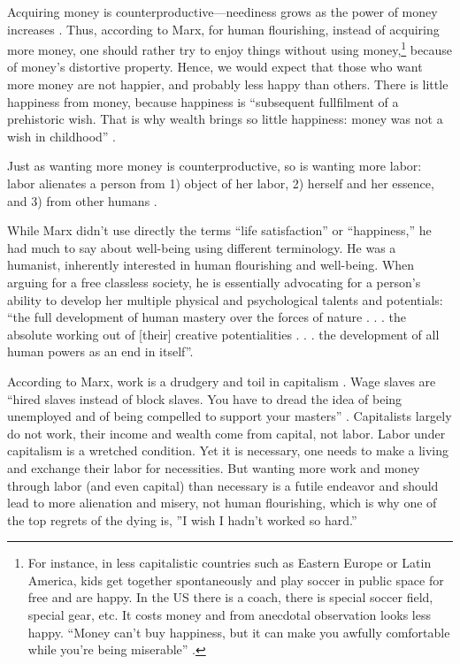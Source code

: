 \documentclass[10pt, letterpaper]{article}
\begin{document}
\begin{spacing}{1.8}
Acquiring money is counterproductive---neediness grows as the power of money increases \citep{marx1844-human-requirements}.
%
Thus, according to Marx, for human flourishing, instead of acquiring more money,
one should rather try to enjoy things without using money,\footnote{For
  instance, in less capitalistic countries such as Eastern Europe or Latin
  America, kids get together spontaneously and play soccer in public space for
  free and are happy. In the US there is a coach, there is special soccer field,
  special gear, etc. It costs money and from anecdotal observation looks less
  happy. ``Money can't buy happiness, but it can make you
awfully comfortable while you're being miserable'' \citep[][p.26]{munier2004being}.} because of money's distortive property. Hence, we would expect that those who want more money are
not happier, and probably less happy than others.  
There is little  happiness from money, because happiness is ``subsequent fullfilment of a
  prehistoric wish. That is why wealth brings so little happiness: money was
  not a wish in childhood'' \citep[Freud cited in][p. 203]{marcuse15}.

  
Just as wanting more money is counterproductive, so is wanting more labor: labor alienates a person from 1) object of her labor, 2) herself and her essence, and 3) from other humans 
\citep{petrovic63}.
  
While Marx didn't use directly the terms ``life satisfaction'' or ``happiness,'' he had much to say about well-being using different terminology. He was a humanist, inherently interested in human flourishing and well-being.
When arguing for a free classless society, he is essentially advocating for a person's ability to develop her multiple physical and psychological talents and potentials: ``the full development of human mastery over
the forces of nature . . . the absolute working out of [their] creative
potentialities . . . the development of all human powers as an end in
itself''\citep[cited in][p. 91]{struhl16}.
% 

According to Marx, work is a drudgery and toil in capitalism \citep{marx10, lyons07}.
%
%
Wage slaves are ``hired slaves instead of block slaves. You have to dread the idea of being unemployed and of being compelled to support your masters'' \citep[p. 283][]{goldman03}.
% 
Capitalists largely do not work, their income and
wealth come from capital, not labor. %
Labor under capitalism is a wretched condition. Yet it is necessary, one needs
to make a living and exchange their labor for necessities. But wanting more work
and money through labor (and even capital) than necessary is a futile endeavor and should lead to
more alienation and misery, not human flourishing, which is why one of the top regrets of the dying is, ''I wish I hadn't worked so hard.''


\end{spacing}
\end{document}
